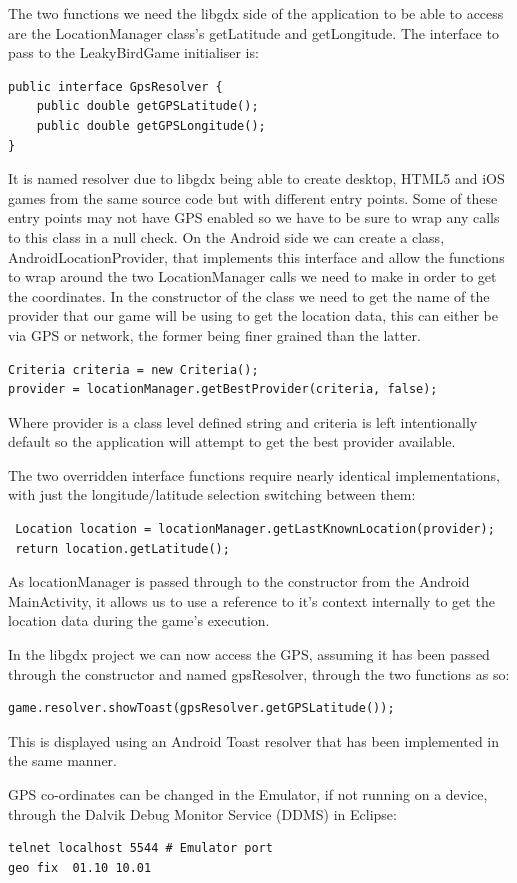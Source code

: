 The two functions we need the libgdx side of the application to be able to access are the LocationManager class's getLatitude and getLongitude. The interface to pass to the LeakyBirdGame initialiser is:
\begin{verbatim}
public interface GpsResolver {
    public double getGPSLatitude();
    public double getGPSLongitude();
}
\end{verbatim}
It is named resolver due to libgdx being able to create desktop, HTML5 and iOS games from the same source code but with different entry points. Some of these entry points may not have GPS enabled so we have to be sure to wrap any calls to this class in a null check. On the Android side we can create a class, AndroidLocationProvider,  that implements this interface and allow the functions to wrap around the two LocationManager calls we need to make in order to get the coordinates. In the constructor of the class we need to get the name of the provider that our game will be using to get the location data, this can either be via GPS or network, the former being finer grained than the latter.
\begin{verbatim}
Criteria criteria = new Criteria();
provider = locationManager.getBestProvider(criteria, false);
\end{verbatim}
Where provider is a class level defined string and criteria is left intentionally default so the application will attempt to get the best provider available.

The two overridden interface functions require nearly identical implementations, with just the longitude/latitude selection switching between them:
\begin{verbatim}
 Location location = locationManager.getLastKnownLocation(provider);
 return location.getLatitude();
\end{verbatim}
As locationManager is passed through to the constructor from the Android MainActivity, it allows us to use a reference to it’s context internally to get the location data during the game’s execution.

In the libgdx project we can now access the GPS, assuming it has been passed through the constructor and named gpsResolver, through the two functions as so:
\begin{verbatim}
game.resolver.showToast(gpsResolver.getGPSLatitude());
\end{verbatim}
This is displayed using an Android Toast resolver that has been implemented in the same manner.

GPS co-ordinates can be changed in the Emulator, if not running on a device,  through the Dalvik Debug Monitor Service (DDMS) in Eclipse:
\begin{verbatim}
telnet localhost 5544 # Emulator port
geo fix  01.10 10.01
\end{verbatim}

